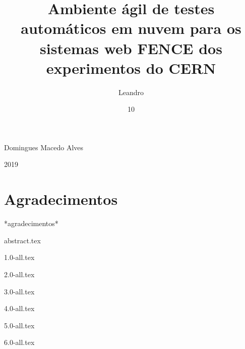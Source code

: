 \documentclass[grad,numbers]{style/coppe}
\begin{document}
  \title{Ambiente ágil de testes automáticos em nuvem para os sistemas web FENCE dos experimentos do CERN}
  \foreigntitle{}
  \author{Leandro}{Domingues Macedo Alves}

  
  \date{10}{2019}


  \maketitle

  \frontmatter
  
  \makecatalog
 
  \chapter*{Agradecimentos}
    
  \indent
  *agradecimentos*
  
  {abstract.tex}

  \tableofcontents
  \listoffigures
  \printlosymbols
  \printloabbreviations

  \mainmatter

  {1.0-all.tex}
  
  {2.0-all.tex}
  
  {3.0-all.tex}

  {4.0-all.tex}

  {5.0-all.tex}

  {6.0-all.tex}

  \backmatter
  \nocite{*}
  \label{bibliografia}
  
\end{document}
